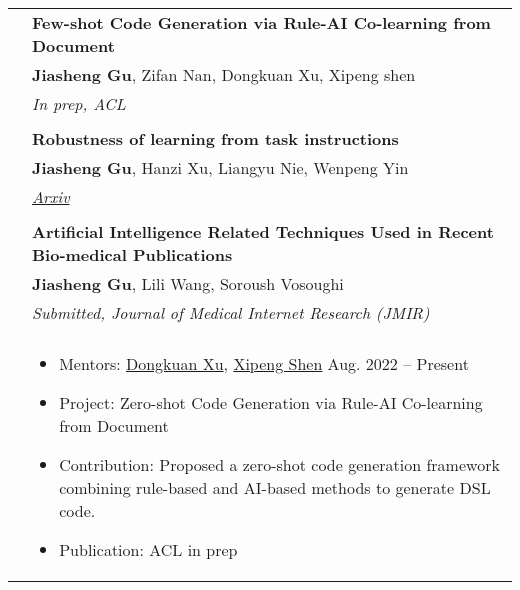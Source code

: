 \documentclass[letterpaper, 10pt]{article}
\begin{document}
\begin{longtable}{p{1.3in}p{4.8in}}

\nohyphens{\color{black}{Publications}}
& \textbf{Few-shot Code Generation via Rule-AI Co-learning from Document\label{few-shot_code}}  \\
& \textbf{Jiasheng Gu}, Zifan Nan, Dongkuan Xu, Xipeng shen \\
& \textit{In prep, ACL}\\
& \\

& \textbf{Robustness of learning from task instructions \label{robustness_instruction}} \\
& \textbf{Jiasheng Gu}, Hanzi Xu, Liangyu Nie, Wenpeng Yin \\
& \href{https://arxiv.org/abs/2212.03813}{\textit{Arxiv}}\\
& \\

& \textbf{Artificial Intelligence Related Techniques Used in Recent Bio-medical Publications} \label{JMIR} \\
& \textbf{Jiasheng Gu}, Lili Wang, Soroush Vosoughi \\
& \textit{Submitted, Journal of Medical Internet Research (JMIR)}\\
& \\


\nohyphens{\color{black}{Research Experience}} 

&  \begin{itemize}[leftmargin=10pt, itemsep=-5pt, topsep=0pt,before=\textbf{North Carolina State University}]
    \item Mentors: \href{http://personal.psu.edu/dux19/}{Dongkuan Xu}, \href{https://people.engr.ncsu.edu/xshen5/}{Xipeng Shen} \hfill Aug. 2022 -- Present 
    \item Project: Zero-shot Code Generation via Rule-AI Co-learning from Document
    \item Contribution: Proposed a zero-shot code generation framework combining rule-based and AI-based methods to generate DSL code.
    \item Publication: ACL in prep
  \end{itemize}\\ 


\end{longtable}
\end{document}
